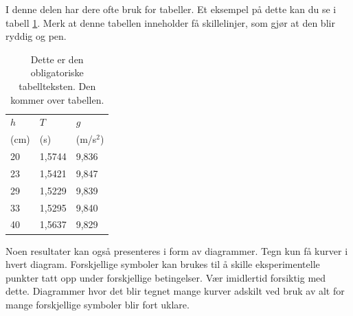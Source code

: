 \documentclass[5p]{elsarticle}
\begin{document}
I denne delen har dere ofte bruk for tabeller. Et eksempel på dette kan du se i tabell \ref{MinLilleTabell}. 
Merk at denne tabellen inneholder få skillelinjer, som gjør at den blir ryddig og pen.
%
%
\begin{table}[htb]
	\begin{center}
		\caption{Dette er den obligatoriske tabellteksten. Den kommer over tabellen.}
		\label{MinLilleTabell}	%
		\vspace{0.5cm}					%
		\begin{tabular}{lll} 		%
			\hline 								%
			$h$  &  $T$  & $g$  \\  			%
			(cm) &  (s) & (m/s$^2$)\\ %
			\hline												
			20   &  1,5744 & 9,836 \\
			23   &  1,5421 & 9,847 \\
			29   &  1,5229 & 9,839 \\
			33   &  1,5295 & 9,840 \\
			40   &	1,5637 & 9,829 \\
			\hline
		\end{tabular}
	\end{center}
\end{table}


Noen resultater kan også presenteres i form av diagrammer.
Tegn kun få kurver i hvert diagram. Forskjellige symboler kan brukes til å skille eksperimentelle punkter tatt opp under forskjellige 
betingelser. Vær imidlertid forsiktig med dette. Diagrammer hvor det blir tegnet mange kurver adskilt 
ved bruk av alt for mange forskjellige symboler blir fort uklare. 
\end{document}
